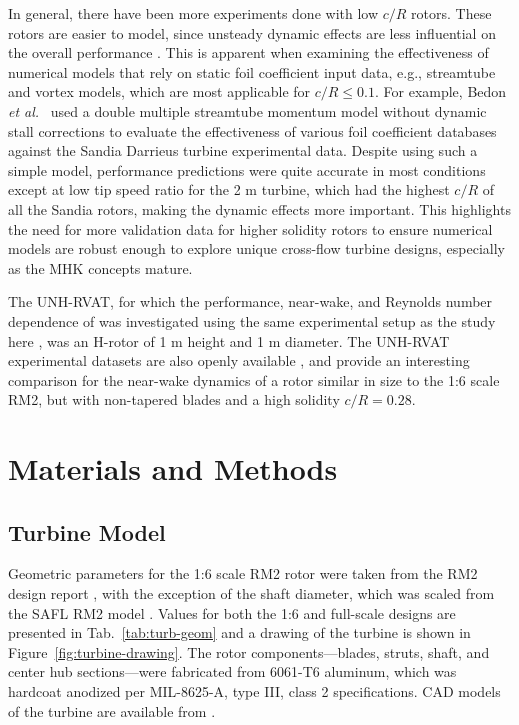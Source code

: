 In general, there have been more experiments done with low $c/R$ rotors. These
rotors are easier to model, since unsteady dynamic effects are less influential
on the overall performance \cite{Strickland1981}. This is apparent when
examining the effectiveness of numerical models that rely on static foil
coefficient input data, e.g., streamtube and vortex models, which are most
applicable for $c/R \leq 0.1$. For example, Bedon \emph{et al.}~\cite{Bedon2014}
used a double multiple streamtube momentum model without dynamic stall
corrections to evaluate the effectiveness of various foil coefficient databases
against the Sandia Darrieus turbine experimental data. Despite using such a
simple model, performance predictions were quite accurate in most conditions
except at low tip speed ratio for the 2 m turbine, which had the highest $c/R$
of all the Sandia rotors, making the dynamic effects more important. This
highlights the need for more validation data for higher solidity rotors to
ensure numerical models are robust enough to explore unique cross-flow turbine
designs, especially as the MHK concepts mature.

The UNH-RVAT, for which the performance, near-wake, and Reynolds number
dependence of was investigated using the same experimental setup as the study
here \cite{Bachant2015-JoT, Bachant2016-Energies}, was an H-rotor of 1 m height
and 1 m diameter. The UNH-RVAT experimental datasets are also openly available
\cite{Bachant2014-RVAT-baseline, Bachant2016-RVAT-Re-dep}, and provide an
interesting comparison for the near-wake dynamics of a rotor similar in size to
the 1:6 scale RM2, but with non-tapered blades and a high solidity $c/R = 0.28$.


\section{Materials and Methods}

\subsection{Turbine Model}

Geometric parameters for the 1:6 scale RM2 rotor were taken from the RM2 design
report \cite{Barone2011}, with the exception of the shaft diameter, which was
scaled from the SAFL RM2 model \cite{Hill2014}. Values for both the 1:6 and
full-scale designs are presented in Tab.~\ref{tab:turb-geom} and a drawing of
the turbine is shown in Figure~\ref{fig:turbine-drawing}. The rotor
components---blades, struts, shaft, and center hub sections---were fabricated
from 6061-T6 aluminum, which was hardcoat anodized per MIL-8625-A, type III,
class 2 specifications. CAD models of the turbine are available from
\cite{Bachant2015-RM2-CAD}.

